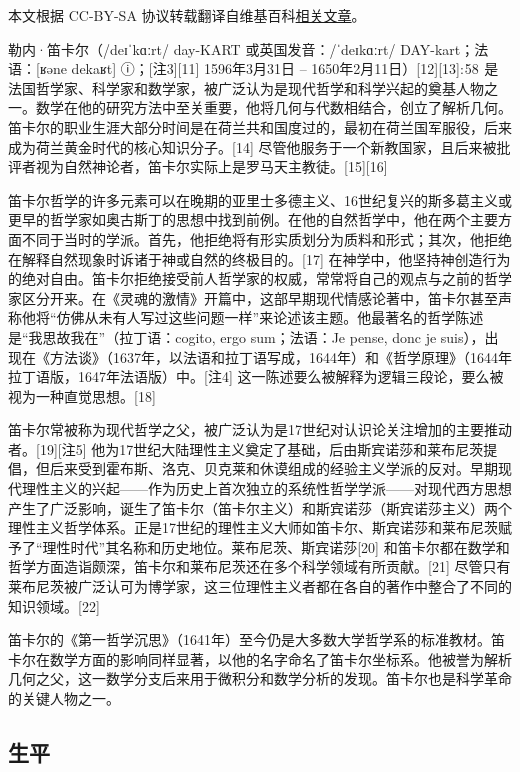
本文根据 CC-BY-SA 协议转载翻译自维基百科\href{https://en.wikipedia.org/wiki/Ren\%C3\%A9_Descartes}{相关文章}。

勒内·笛卡尔（/deɪˈkɑːrt/ day-KART 或英国发音：/ˈdeɪkɑːrt/ DAY-kart；法语：[ʁəne dekaʁt] ⓘ；[注3][11] 1596年3月31日 – 1650年2月11日）[12][13]: 58  是法国哲学家、科学家和数学家，被广泛认为是现代哲学和科学兴起的奠基人物之一。数学在他的研究方法中至关重要，他将几何与代数相结合，创立了解析几何。笛卡尔的职业生涯大部分时间是在荷兰共和国度过的，最初在荷兰国军服役，后来成为荷兰黄金时代的核心知识分子。[14] 尽管他服务于一个新教国家，且后来被批评者视为自然神论者，笛卡尔实际上是罗马天主教徒。[15][16]

笛卡尔哲学的许多元素可以在晚期的亚里士多德主义、16世纪复兴的斯多葛主义或更早的哲学家如奥古斯丁的思想中找到前例。在他的自然哲学中，他在两个主要方面不同于当时的学派。首先，他拒绝将有形实质划分为质料和形式；其次，他拒绝在解释自然现象时诉诸于神或自然的终极目的。[17] 在神学中，他坚持神创造行为的绝对自由。笛卡尔拒绝接受前人哲学家的权威，常常将自己的观点与之前的哲学家区分开来。在《灵魂的激情》开篇中，这部早期现代情感论著中，笛卡尔甚至声称他将“仿佛从未有人写过这些问题一样”来论述该主题。他最著名的哲学陈述是“我思故我在”（拉丁语：cogito, ergo sum；法语：Je pense, donc je suis），出现在《方法谈》（1637年，以法语和拉丁语写成，1644年）和《哲学原理》（1644年拉丁语版，1647年法语版）中。[注4] 这一陈述要么被解释为逻辑三段论，要么被视为一种直觉思想。[18]

笛卡尔常被称为现代哲学之父，被广泛认为是17世纪对认识论关注增加的主要推动者。[19][注5] 他为17世纪大陆理性主义奠定了基础，后由斯宾诺莎和莱布尼茨提倡，但后来受到霍布斯、洛克、贝克莱和休谟组成的经验主义学派的反对。早期现代理性主义的兴起——作为历史上首次独立的系统性哲学学派——对现代西方思想产生了广泛影响，诞生了笛卡尔（笛卡尔主义）和斯宾诺莎（斯宾诺莎主义）两个理性主义哲学体系。正是17世纪的理性主义大师如笛卡尔、斯宾诺莎和莱布尼茨赋予了“理性时代”其名称和历史地位。莱布尼茨、斯宾诺莎[20] 和笛卡尔都在数学和哲学方面造诣颇深，笛卡尔和莱布尼茨还在多个科学领域有所贡献。[21] 尽管只有莱布尼茨被广泛认可为博学家，这三位理性主义者都在各自的著作中整合了不同的知识领域。[22]

笛卡尔的《第一哲学沉思》（1641年）至今仍是大多数大学哲学系的标准教材。笛卡尔在数学方面的影响同样显著，以他的名字命名了笛卡尔坐标系。他被誉为解析几何之父，这一数学分支后来用于微积分和数学分析的发现。笛卡尔也是科学革命的关键人物之一。
\subsection{生平}

